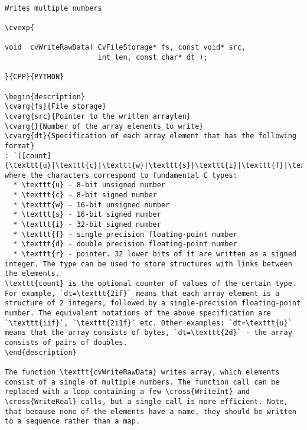 \begin{verbatim}

Writes multiple numbers

\cvexp{

void  cvWriteRawData( CvFileStorage* fs, const void* src,
                      int len, const char* dt );

}{CPP}{PYTHON}

\begin{description}
\cvarg{fs}{File storage}
\cvarg{src}{Pointer to the written arraylen}
\cvarg{}{Number of the array elements to write}
\cvarg{dt}{Specification of each array element that has the following format}
: `([count]{\texttt{u}|\texttt{c}|\texttt{w}|\texttt{s}|\texttt{i}|\texttt{f}|\texttt{d}})...`, where the characters correspond to fundamental C types:
  * \texttt{u} - 8-bit unsigned number
  * \texttt{c} - 8-bit signed number
  * \texttt{w} - 16-bit unsigned number
  * \texttt{s} - 16-bit signed number
  * \texttt{i} - 32-bit signed number
  * \texttt{f} - single precision floating-point number
  * \texttt{d} - double precision floating-point number
  * \texttt{r} - pointer. 32 lower bits of it are written as a signed integer. The type can be used to store structures with links between the elements.
\texttt{count} is the optional counter of values of the certain type. For example, `dt=\texttt{2if}` means that each array element is a structure of 2 integers, followed by a single-precision floating-point number. The equivalent notations of the above specification are `\texttt{iif}`, `\texttt{2i1f}` etc. Other examples: `dt=\texttt{u}` means that the array consists of bytes, `dt=\texttt{2d}` - the array consists of pairs of doubles.
\end{description}

The function \texttt{cvWriteRawData} writes array, which elements consist of a single of multiple numbers. The function call can be replaced with a loop containing a few \cross{WriteInt} and \cross{WriteReal} calls, but a single call is more efficient. Note, that because none of the elements have a name, they should be written to a sequence rather than a map.


\end{verbatim}
